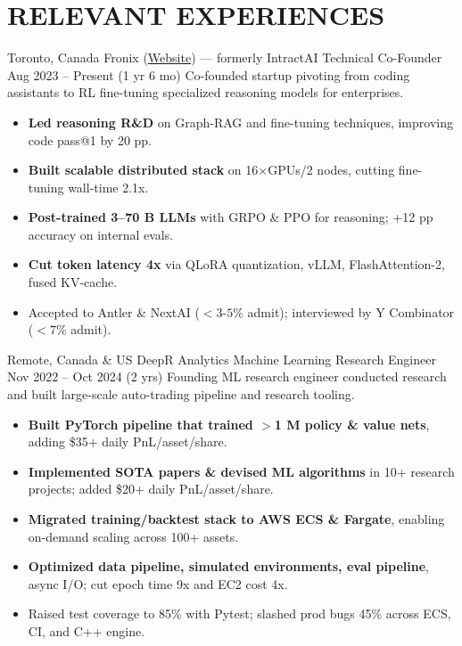 \section{RELEVANT EXPERIENCES}

{\customcventry
    {Toronto, Canada}
    {Fronix (\href{https://fronix.net}{Website}) — formerly IntractAI}
    {Technical Co-Founder}
    {Aug 2023 – Present (1 yr 6 mo)}{}{}}
    Co-founded startup pivoting from coding assistants to RL fine-tuning specialized reasoning models for enterprises.
    \begin{itemize}
        \item \textbf{Led reasoning R\&D} on Graph-RAG and fine-tuning techniques, improving code pass@1 by 20 pp.
        \item \textbf{Built scalable distributed stack} on 16×GPUs/2 nodes, cutting fine-tuning wall-time 2.1x.
        \item \textbf{Post-trained 3–70 B LLMs} with GRPO \& PPO for reasoning; +12 pp accuracy on internal evals.
        \item \textbf{Cut token latency 4x} via QLoRA quantization, vLLM, FlashAttention-2, fused KV-cache.
        \item Accepted to Antler \& NextAI ($<$$3$-$5\%$ admit); interviewed by Y Combinator ($<$$7\%$ admit).
    \end{itemize}


{\customcventry
    {Remote, Canada \& US}
    {DeepR Analytics}
    {Machine Learning Research Engineer}
    {Nov 2022 – Oct 2024 (2 yrs)}{}{}}
    Founding ML research engineer conducted research and built large-scale auto-trading pipeline and research tooling.
    \begin{itemize}
        \item \textbf{Built PyTorch pipeline that trained $>$1 M policy \& value nets}, adding \$35+ daily PnL/asset/share.
        \item \textbf{Implemented SOTA papers \& devised ML algorithms} in 10+ research projects; added \$20+ daily PnL/asset/share.
        \item \textbf{Migrated training/backtest stack to AWS ECS \& Fargate}, enabling on-demand scaling across 100+ assets.
        \item \textbf{Optimized data pipeline, simulated environments, eval pipeline}, async I/O; cut epoch time 9x and EC2 cost 4x.
        \item Raised test coverage to 85\% with Pytest; slashed prod bugs 45\% across ECS, CI, and C++ engine.
    \end{itemize}
  

